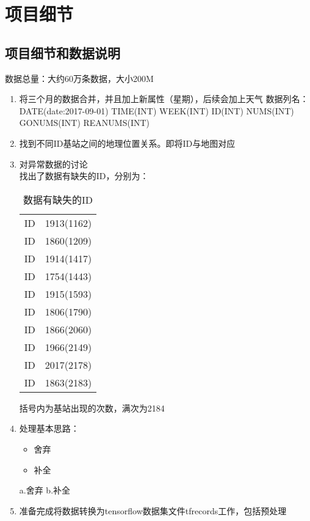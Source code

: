 
\chapter{项目细节} %
\label{AppendixA} %
\section{项目细节和数据说明}
数据总量：大约60万条数据，大小200M
\begin{enumerate}
	\item 将三个月的数据合并，并且加上新属性（星期），后续会加上天气
	数据列名：
	DATE(date:2017-09-01)	TIME(INT)		WEEK(INT)	ID(INT)	NUMS(INT)	GONUMS(INT)	REANUMS(INT)
	\item 找到不同ID基站之间的地理位置关系。即将ID与地图对应
	\item 对异常数据的讨论 \\
	找出了数据有缺失的ID，分别为：\\
	\begin{table}
	\label{tb:id}
	\centering
	\caption{数据有缺失的ID}
	\begin{tabular}{c|c}
	\hline
	\hline
	ID & 1913(1162) \\
	ID & 1860(1209) \\
	ID & 1914(1417) \\
	ID & 1754(1443) \\
	ID & 1915(1593) \\
	ID & 1806(1790) \\
	ID & 1866(2060) \\
	ID & 1966(2149) \\
	ID & 2017(2178) \\
	ID & 1863(2183) \\
	\hline
	\hline
	\end{tabular}
	\end{table}
	括号内为基站出现的次数，满次为2184
	\item 处理基本思路：
	\begin{itemize}
		\item 舍弃
		\item 补全
	\end{itemize}
		a.舍弃
		b.补全
	\item 准备完成将数据转换为tensorflow数据集文件tfrecords工作，包括预处理
\end{enumerate}

